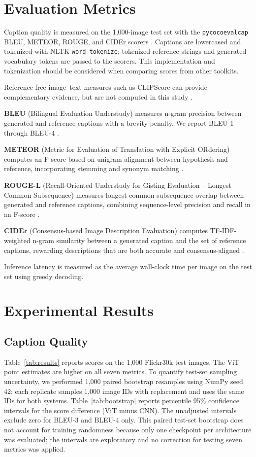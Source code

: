\documentclass[conference]{IEEEtran}
\begin{document}
\section{Evaluation Metrics}

Caption quality is measured on the 1{,}000-image test set with the \texttt{pycocoevalcap} BLEU, METEOR, ROUGE, and CIDEr scorers \cite{chen2015coco}. Captions are lowercased and tokenized with NLTK \texttt{word\_tokenize}; tokenized reference strings and generated vocabulary tokens are passed to the scorers. This implementation and tokenization should be considered when comparing scores from other toolkits.

Reference-free image--text measures such as CLIPScore can provide complementary evidence, but are not computed in this study \cite{clipscore2021}.

\textbf{BLEU} (Bilingual Evaluation Understudy) measures n-gram precision between generated and reference captions with a brevity penalty. We report BLEU-1 through BLEU-4 \cite{papineni2002}.

\textbf{METEOR} (Metric for Evaluation of Translation with Explicit ORdering) computes an F-score based on unigram alignment between hypothesis and reference, incorporating stemming and synonym matching \cite{banerjee2005}.

\textbf{ROUGE-L} (Recall-Oriented Understudy for Gisting Evaluation -- Longest Common Subsequence) measures longest-common-subsequence overlap between generated and reference captions, combining sequence-level precision and recall in an F-score \cite{lin2004}.

\textbf{CIDEr} (Consensus-based Image Description Evaluation) computes TF-IDF-weighted n-gram similarity between a generated caption and the set of reference captions, rewarding descriptions that are both accurate and consensus-aligned \cite{vedantam2015}.

Inference latency is measured as the average wall-clock time per image on the test set using greedy decoding.

\section{Experimental Results}

\subsection{Caption Quality}

Table~\ref{tab:results} reports scores on the 1{,}000 Flickr30k test images. The ViT point estimates are higher on all seven metrics. To quantify test-set sampling uncertainty, we performed 1{,}000 paired bootstrap resamples using NumPy seed 42: each replicate samples 1{,}000 image IDs with replacement and uses the same IDs for both systems. Table~\ref{tab:bootstrap} reports percentile 95\% confidence intervals for the score difference (ViT minus CNN). The unadjusted intervals exclude zero for BLEU-3 and BLEU-4 only. This paired test-set bootstrap does not account for training randomness because only one checkpoint per architecture was evaluated; the intervals are exploratory and no correction for testing seven metrics was applied.
\end{document}
